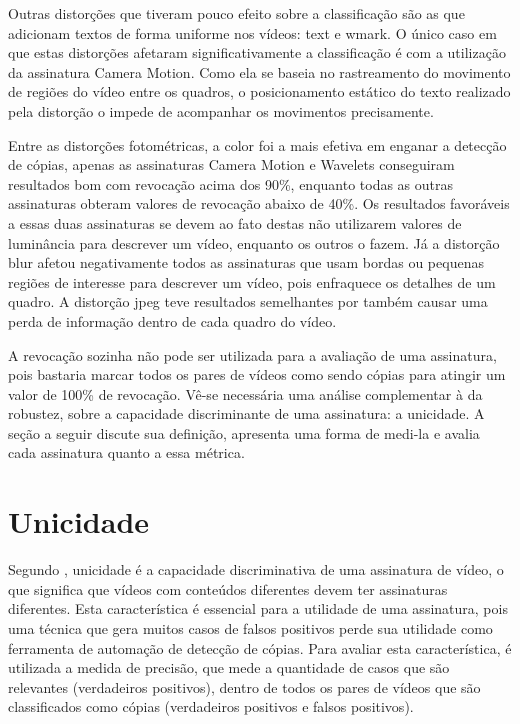 Outras distorções que tiveram pouco efeito sobre a classificação são as que adicionam textos de forma uniforme nos vídeos: text e wmark. O único caso em que estas distorções afetaram significativamente a classificação é com a utilização da assinatura Camera Motion. Como ela se baseia no rastreamento do movimento de regiões do vídeo entre os quadros, o posicionamento estático do texto realizado pela distorção o impede de acompanhar os movimentos precisamente.

Entre as distorções fotométricas, a color foi a mais efetiva em enganar a detecção de cópias, apenas as assinaturas Camera Motion e Wavelets conseguiram resultados bom com revocação acima dos 90\%, enquanto todas as outras assinaturas obteram valores de revocação abaixo de 40\%. Os resultados favoráveis a essas duas assinaturas se devem ao fato destas não utilizarem valores de luminância para descrever um vídeo, enquanto os outros o fazem. Já a distorção blur afetou negativamente todos as assinaturas que usam bordas ou pequenas regiões de interesse para descrever um vídeo, pois enfraquece os detalhes de um quadro. A distorção jpeg teve resultados semelhantes por também causar uma perda de informação dentro de cada quadro do vídeo. 


A revocação sozinha não pode ser utilizada para a avaliação de uma assinatura, pois bastaria marcar todos os pares de vídeos como sendo cópias para atingir um valor de 100\% de revocação. Vê-se necessária uma análise complementar à da robustez, sobre a capacidade discriminante de uma assinatura: a unicidade. A seção a seguir discute sua definição, apresenta uma forma de medi-la e avalia cada assinatura quanto a essa métrica.

\section{Unicidade}

Segundo \citeauthor{hua2004robust}, unicidade é a capacidade discriminativa de uma assinatura de vídeo, o que significa que vídeos com conteúdos diferentes devem ter assinaturas diferentes. Esta característica é essencial para a utilidade de uma assinatura, pois uma técnica que gera muitos casos de falsos positivos perde sua utilidade como ferramenta de automação de detecção de cópias. Para avaliar esta característica, é utilizada a medida de precisão, que mede a quantidade de casos que são relevantes (verdadeiros positivos), dentro de todos os pares de vídeos que são classificados como cópias (verdadeiros positivos e falsos positivos)\cite{Ting2010}.

